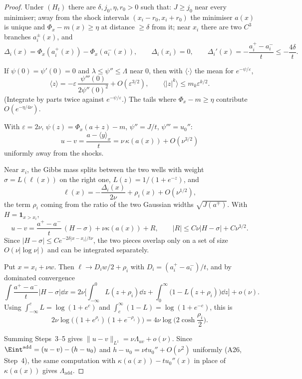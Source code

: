 \begin{proof}
Under $(H_t)$ there are $\delta,j_0,\eta,r_0>0$ such that: $J\ge j_0$ near every minimiser; away from the shock intervals $(x_i-r_0,x_i+r_0)$ the minimiser $a(x)$ is unique and $\Phi_x-m(x)\ge\eta$ at distance $\ge\delta$ from it; near $x_i$ there are two $C^3$ branches $a_i^\pm(x)$, and
\[
\Delta_i(x)=\Phi_x(a_i^+(x))-\Phi_x(a_i^-(x)),\qquad \Delta_i(x_i)=0,\qquad \Delta_i'(x)=-\frac{a_i^+-a_i^-}{t}\le-\frac{4\delta}{t}.
\]

If $\psi(0)=\psi'(0)=0$ and $\lambda\le\psi''\le\Lambda$ near $0$, then with $\langle\cdot\rangle$ the mean for $e^{-\psi/\varepsilon}$,
\[
\langle z\rangle=-\varepsilon\,\frac{\psi'''(0)}{2\psi''(0)^2}+O(\varepsilon^{3/2}),\qquad \langle|z|^k\rangle\le m_k\varepsilon^{k/2}.
\]
(Integrate by parts twice against $e^{-\psi/\varepsilon}$.) The tails where $\Phi_x-m\ge\eta$ contribute $O(e^{-\eta/4\nu})$.

With $\varepsilon=2\nu$, $\psi(z)=\Phi_x(a+z)-m$, $\psi''=J/t$, $\psi'''=u_0''$:
\[
u-v=\frac{a-\langle y\rangle_x}{t}=\nu\,\kappa(a(x))+O(\nu^{3/2})
\]
uniformly away from the shocks.

Near $x_i$, the Gibbs mass splits between the two wells with weight $\sigma=L(\ell(x))$ on the right one, $L(z)=1/(1+e^{-z})$, and
\[
\ell(x)=-\frac{\Delta_i(x)}{2\nu}+\rho_i(x)+O(\nu^{1/2}),
\]
the term $\rho_i$ coming from the ratio of the two Gaussian widths $\sqrt{J(a^\mp)}$. With $H=\mathbf 1_{x>x_i}$,
\[
u-v=\frac{a^+-a^-}{t}\,(H-\sigma)+\nu\kappa(a(x))+R,\qquad |R|\le C\nu|H-\sigma|+C\nu^{3/2}.
\]
Since $|H-\sigma|\le Ce^{-2\delta|x-x_i|/t\nu}$, the two pieces overlap only on a set of size $O(\nu|\log\nu|)$ and can be integrated separately.

Put $x=x_i+\nu w$. Then $\ell\to D_iw/2+\rho_i$ with $D_i=(a_i^+-a_i^-)/t$, and by dominated convergence
\[
\int\frac{a^+-a^-}{t}|H-\sigma|\dd x=2\nu\Big[\int_{-\infty}^0L(z+\rho_i)\dd z+\int_0^\infty\big(1-L(z+\rho_i)\big)\dd z\Big]+o(\nu).
\]
Using $\int_{-\infty}^cL=\log(1+e^c)$ and $\int_c^\infty(1-L)=\log(1+e^{-c})$, this is
\[
2\nu\log\big((1+e^{\rho_i})(1+e^{-\rho_i})\big)=4\nu\log\Big(2\cosh\frac{\rho_i}{2}\Big).
\]

Summing Steps~3--5 gives $\|u-v\|_{L^1}=\nu\Lambda_{uv}+o(\nu)$. Since $\Eint^{\mathrm{add}}=(u-v)-(h-u_0)$ and $h-u_0=\nu tu_0''+O(\nu^2)$ uniformly (A26, Step~4), the same computation with $\kappa(a(x))-tu_0''(x)$ in place of $\kappa(a(x))$ gives $\Lambda_{\mathrm{add}}$.

\end{proof}

